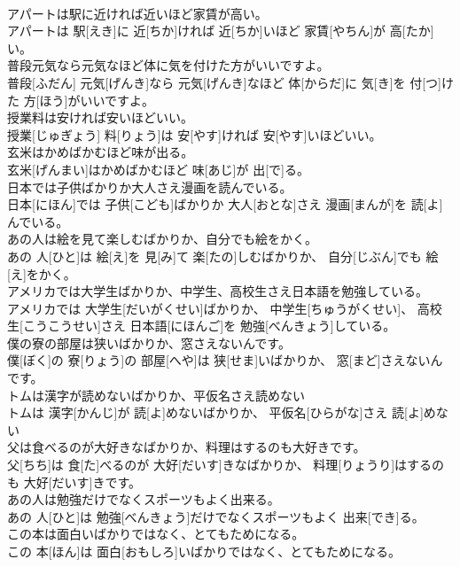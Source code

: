 \documentclass[8pt]{extreport}
\begin{document}
\begin{CJK}{UTF8}{min}
\\	アパートは駅に近ければ近いほど家賃が高い。	
\\	アパートは 駅[えき]に 近[ちか]ければ 近[ちか]いほど 家賃[やちん]が 高[たか]い。
\\	普段元気なら元気なほど体に気を付けた方がいいですよ。	
\\	普段[ふだん] 元気[げんき]なら 元気[げんき]なほど 体[からだ]に 気[き]を 付[つ]けた 方[ほう]がいいですよ。
\\	授業料は安ければ安いほどいい。	
\\	授業[じゅぎょう] 料[りょう]は 安[やす]ければ 安[やす]いほどいい。
\\	玄米はかめばかむほど味が出る。	
\\	玄米[げんまい]はかめばかむほど 味[あじ]が 出[で]る。
\\	日本では子供ばかりか大人さえ漫画を読んでいる。	
\\	日本[にほん]では 子供[こども]ばかりか 大人[おとな]さえ 漫画[まんが]を 読[よ]んでいる。
\\	あの人は絵を見て楽しむばかりか、自分でも絵をかく。	
\\	あの 人[ひと]は 絵[え]を 見[み]て 楽[たの]しむばかりか、 自分[じぶん]でも 絵[え]をかく。
\\	アメリカでは大学生ばかりか、中学生、高校生さえ日本語を勉強している。	
\\	アメリカでは 大学生[だいがくせい]ばかりか、 中学生[ちゅうがくせい]、 高校生[こうこうせい]さえ 日本語[にほんご]を 勉強[べんきょう]している。
\\	僕の寮の部屋は狭いばかりか、窓さえないんです。	
\\	僕[ぼく]の 寮[りょう]の 部屋[へや]は 狭[せま]いばかりか、 窓[まど]さえないんです。
\\	トムは漢字が読めないばかりか、平仮名さえ読めない	
\\	トムは 漢字[かんじ]が 読[よ]めないばかりか、 平仮名[ひらがな]さえ 読[よ]めない
\\	父は食べるのが大好きなばかりか、料理はするのも大好きです。	
\\	父[ちち]は 食[た]べるのが 大好[だいす]きなばかりか、 料理[りょうり]はするのも 大好[だいす]きです。
\\	あの人は勉強だけでなくスポーツもよく出来る。	
\\	あの 人[ひと]は 勉強[べんきょう]だけでなくスポーツもよく 出来[でき]る。
\\	この本は面白いばかりではなく、とてもためになる。	
\\	この 本[ほん]は 面白[おもしろ]いばかりではなく、とてもためになる。

\end{CJK}
\end{document}
